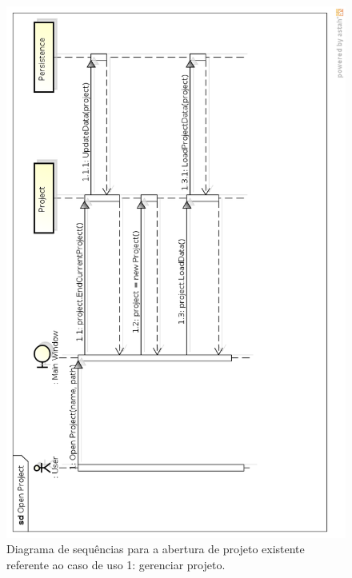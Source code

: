 \begin{figure}
\centering
\includegraphics[scale=0.47]{open-project}
\caption{Diagrama de sequências para a abertura de projeto existente referente ao caso de uso 1: gerenciar projeto.}
\label{fig:open-project}
\end{figure}

